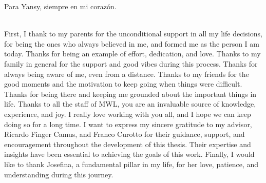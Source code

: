 \documentclass[
	english, %
	letterpaper, oneside
]{book}
\begin{document}
\begin{dedicatory}
	Para Yansy, siempre en mi corazón. \\
	~ \\
\end{dedicatory}

\begin{acknowledgments}
	First, I thank to my parents for the unconditional support in all my life decisions, for being the ones who always believed in me, and formed me as the person I am today. Thanks for being an example of effort, dedication, and love.
\newp
 Thanks to my family in general for the support and good vibes during this process. Thanks for always being aware of me, even from a distance.
\newp
 Thanks to my friends for the good moments and the motivation to keep going when things were difficult. Thanks for being there and keeping me grounded about the important things in life.
\newp
 Thanks to all the staff of MWL, you are an invaluable source of knowledge, experience, and joy. I really love working with you all, and I hope we can keep doing so for a long time.
\newp
 I want to express my sincere gratitude to my advisor, Ricardo Finger Camus, and Franco Curotto for their guidance, support, and encouragement throughout the development of this thesis. Their expertise and insights have been essential to achieving the goals of this work.
\newp
 Finally, I would like to thank Josefina, a fundamental pillar in my life, for her love, patience, and understanding during this journey.

\end{acknowledgments}

\templateIndex

\end{document}
